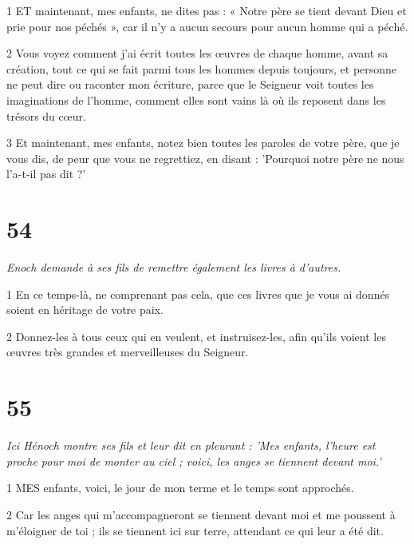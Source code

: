 \par 1 ET maintenant, mes enfants, ne dites pas : « Notre père se tient devant Dieu et prie pour nos péchés », car il n'y a aucun secours pour aucun homme qui a péché.

\par 2 Vous voyez comment j'ai écrit toutes les œuvres de chaque homme, avant sa création, tout ce qui se fait parmi tous les hommes depuis toujours, et personne ne peut dire ou raconter mon écriture, parce que le Seigneur voit toutes les imaginations de l'homme, comment elles sont vains là où ils reposent dans les trésors du cœur.

\par 3 Et maintenant, mes enfants, notez bien toutes les paroles de votre père, que je vous dis, de peur que vous ne regrettiez, en disant : 'Pourquoi notre père ne nous l'a-t-il pas dit ?'

\chapter{54}

\par \textit{Enoch demande à ses fils de remettre également les livres à d'autres.}

\par 1 En ce temps-là, ne comprenant pas cela, que ces livres que je vous ai donnés soient en héritage de votre paix.

\par 2 Donnez-les à tous ceux qui en veulent, et instruisez-les, afin qu'ils voient les œuvres très grandes et merveilleuses du Seigneur.



\chapter{55}

\par \textit{Ici Hénoch montre ses fils et leur dit en pleurant : 'Mes enfants, l'heure est proche pour moi de monter au ciel ; voici, les anges se tiennent devant moi.'}

\par 1 MES enfants, voici, le jour de mon terme et le temps sont approchés.

\par 2 Car les anges qui m'accompagneront se tiennent devant moi et me poussent à m'éloigner de toi ; ils se tiennent ici sur terre, attendant ce qui leur a été dit.

